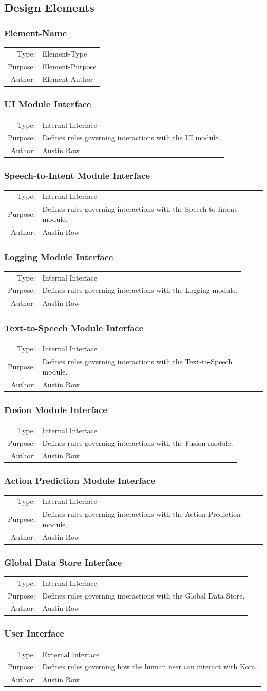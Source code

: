 \documentclass[onecolumn, draftclsnofoot,10pt, compsoc]{IEEEtran}
\def \botname{Kora\xspace}
\newcommand{\designElementDef}[4]{
    \subsubsection{#1}
    \begin{tabular}[t]{r p{6in}}
        Type: & #2 \\
        Purpose: & #3 \\
        Author: & #4 \\
    \end{tabular}
}
\begin{document}
    \subsection{Design Elements}
        \designElementDef{Element-Name}{Element-Type}{Element-Purpose}{Element-Author}
        \designElementDef{UI Module Interface}{Internal Interface}{Defines rules governing interactions with the UI module.}{Austin Row}
        \designElementDef{Speech-to-Intent Module Interface}{Internal Interface}{Defines rules governing interactions with the Speech-to-Intent module.}{Austin Row}
        \designElementDef{Logging Module Interface}{Internal Interface}{Defines rules governing interactions with the Logging module.}{Austin Row}
        \designElementDef{Text-to-Speech Module Interface}{Internal Interface}{Defines rules governing interactions with the Text-to-Speech module.}{Austin Row}
        \designElementDef{Fusion Module Interface}{Internal Interface}{Defines rules governing interactions with the Fusion module.}{Austin Row}
        \designElementDef{Action Prediction Module Interface}{Internal Interface}{Defines rules governing interactions with the Action Prediction module.}{Austin Row}
        \designElementDef{Global Data Store Interface}{Internal Interface}{Defines rules governing interactions with the Global Data Store.}{Austin Row}
        \designElementDef{User Interface}{External Interface}{Defines rules governing how the human user can interact with \botname.}{Austin Row}
\end{document}
